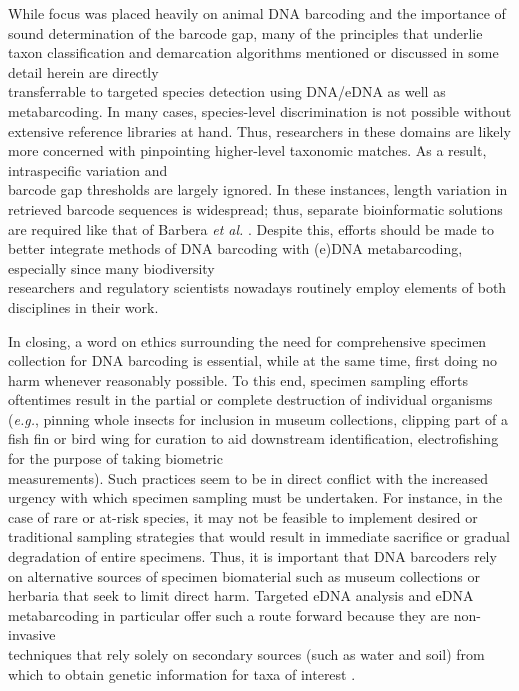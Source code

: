 While focus was placed heavily on animal DNA barcoding and the importance of sound determination of the barcode gap, many of the principles that underlie taxon classification and demarcation algorithms mentioned or discussed in some detail herein are directly \\ transferrable to targeted species detection using DNA/eDNA as well as metabarcoding. In many cases, species-level discrimination is not possible without extensive reference libraries at hand. Thus, researchers in these domains are likely more concerned with pinpointing higher-level taxonomic matches. As a result, intraspecific variation and \\ barcode gap thresholds are largely ignored. In these instances, length variation in retrieved barcode sequences is widespread; thus, separate bioinformatic solutions are required like that of Barbera \textit{et al.} \cite{barbera2019epang}. Despite this, efforts should be made to better integrate methods of DNA barcoding with (e)DNA metabarcoding, especially since many biodiversity \\ researchers and regulatory scientists nowadays routinely employ elements of both \\ disciplines in their work. 

    

In closing, a word on ethics surrounding the need for comprehensive specimen \\ collection for DNA barcoding is essential, while at the same time, first doing no harm whenever reasonably possible. To this end, specimen sampling efforts oftentimes result in the partial or complete destruction of individual organisms (\textit{e.g.}, pinning whole insects for inclusion in museum collections, clipping part of a fish fin or bird wing for curation to aid downstream identification, electrofishing for the purpose of taking biometric \\ measurements). Such practices seem to be in direct conflict with the increased urgency with which specimen sampling must be undertaken. For instance, in the case of rare or at-risk species, it may not be feasible to implement desired or traditional sampling strategies that would result in immediate sacrifice or gradual degradation of entire specimens. Thus, it is important that DNA barcoders rely on alternative sources of specimen biomaterial such as museum collections or herbaria that seek to limit direct harm. Targeted eDNA analysis and eDNA metabarcoding in particular offer such a route forward because they are non-invasive \\ techniques that rely solely on secondary sources (such as water and soil) from which to obtain genetic information for taxa of interest \cite{thomsen2015environmental}.



